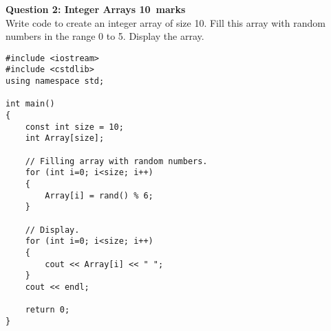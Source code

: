 \documentclass[12pt,a4paper]{article}
\def\Qtwo{10}
\begin{document}
\newpage
\noindent\textbf{Question 2: Integer Arrays \hfill \Qtwo~marks}\\
Write code to create an integer array of size 10. Fill this array with random numbers in the range 0 to 5. Display the array.
\begin{lstlisting}[escapechar=!]
#include <iostream>
#include <cstdlib>
using namespace std;

int main()
{
	const int size = 10;
	int Array[size];

	// Filling array with random numbers.
	for (int i=0; i<size; i++)
	{
		Array[i] = rand() % 6;
	}
	
	// Display.
	for (int i=0; i<size; i++)
	{
		cout << Array[i] << " ";
	}
	cout << endl;
	
	return 0;
}
\end{lstlisting}
\end{document}

